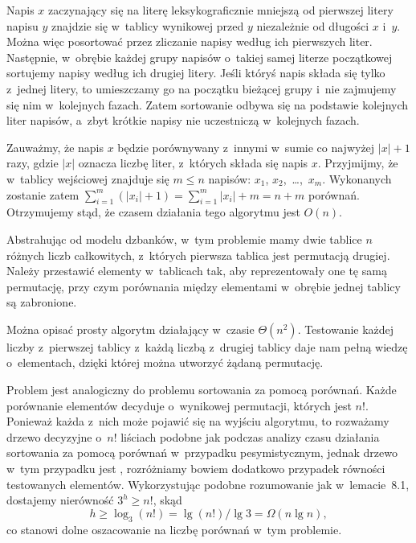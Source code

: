 \subproblem %
Napis $x$ zaczynający się na literę leksykograficznie mniejszą od pierwszej litery napisu $y$ znajdzie się w~tablicy wynikowej przed $y$ niezależnie od długości $x$ i~$y$. Można więc posortować przez zliczanie napisy według ich pierwszych liter. Następnie, w~obrębie każdej grupy napisów o~takiej samej literze początkowej sortujemy napisy według ich drugiej litery. Jeśli któryś napis składa się tylko z~jednej litery, to umieszczamy go na początku bieżącej grupy i~nie zajmujemy się nim w~kolejnych fazach. Zatem sortowanie odbywa się na podstawie kolejnych liter napisów, a~zbyt krótkie napisy nie uczestniczą w~kolejnych fazach.

Zauważmy, że napis $x$ będzie porównywany z~innymi w~sumie co najwyżej $|x|+1$ razy, gdzie $|x|$ oznacza liczbę liter, z~których składa się napis $x$. Przyjmijmy, że w~tablicy wejściowej znajduje się $m\le n$ napisów: $x_1$, $x_2$,~\dots,~$x_m$. Wykonanych zostanie zatem $\sum_{i=1}^m(|x_i|+1)=\sum_{i=1}^m|x_i|+m=n+m$ porównań. Otrzymujemy stąd, że czasem działania tego algorytmu jest $O(n)$.


\subproblem %
Abstrahując od modelu dzbanków, w~tym problemie mamy dwie tablice $n$ różnych liczb całkowitych, z~których pierwsza tablica jest permutacją drugiej. Należy przestawić elementy w~tablicach tak, aby reprezentowały one tę samą permutację, przy czym porównania między elementami w~obrębie jednej tablicy są zabronione.

Można opisać prosty algorytm działający w~czasie $\Theta(n^2)$. Testowanie każdej liczby z~pierwszej tablicy z~każdą liczbą z~drugiej tablicy daje nam pełną wiedzę o~elementach, dzięki której można utworzyć żądaną permutację.

\subproblem %
Problem jest analogiczny do problemu sortowania za pomocą porównań. Każde porównanie elementów decyduje o~wynikowej permutacji, których jest $n!$. Ponieważ każda z~nich może pojawić się na wyjściu algorytmu, to rozważamy drzewo decyzyjne o~$n!$ liściach podobne jak podczas analizy czasu działania sortowania za pomocą porównań w~przypadku pesymistycznym, jednak drzewo w~tym przypadku jest , rozróżniamy bowiem dodatkowo przypadek równości testowanych elementów. Wykorzystując podobne rozumowanie jak w~lemacie~8.1, dostajemy nierówność $3^h\ge n!$, skąd
\[
	h \ge \log_3(n!) = \lg(n!)/\!\lg3 = \Omega(n\lg n),
\]
co stanowi dolne oszacowanie na liczbę porównań w~tym problemie.

\subproblem %

